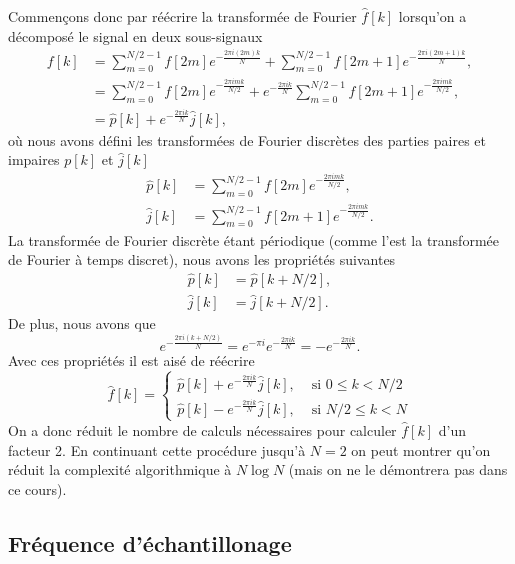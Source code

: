 \documentclass[a4paper,12pt]{book}
\newcommand{\fh}{\hat{f}}
\begin{document}
Commençons donc par réécrire la transformée de Fourier $\fh[k]$ lorsqu'on a décomposé le
signal en deux sous-signaux
\begin{align}
 f[k]&=\sum_{m=0}^{N/2-1} f[2m]e^{-\frac{2\pi i (2m) k}{N}}+\sum_{m=0}^{N/2-1}
 f[2m+1]e^{-\frac{2\pi i (2m+1) k}{N}},\nonumber\\
 &=\sum_{m=0}^{N/2-1} f[2m]e^{-\frac{2\pi i m k}{N/2}}+e^{-\frac{2\pi i k}{N}}\sum_{m=0}^{N/2-1} f[2m+1]e^{-\frac{2\pi i m k}{N/2}},\nonumber\\
 &=\hat{p}[k]+e^{-\frac{2\pi i k}{N}}\hat{j}[k],
\end{align}
où nous avons défini les transformées de Fourier discrètes des parties paires et impaires
$p[k]$ et $\hat{j}[k]$
\begin{align}
 \hat{p}[k]&=\sum_{m=0}^{N/2-1} f[2m]e^{-\frac{2\pi i m k}{N/2}},\\
 \hat{j}[k]&=\sum_{m=0}^{N/2-1} f[2m+1]e^{-\frac{2\pi i m k}{N/2}}.
\end{align}
La transformée de Fourier discrète étant périodique (comme l'est la transformée de Fourier à 
temps discret), nous avons les propriétés suivantes
\begin{align}
 \hat{p}[k]&=\hat{p}[k+N/2],\\
 \hat{j}[k]&=\hat{j}[k+N/2].
\end{align}
De plus, nous avons que 
\begin{equation}
 e^{-\frac{2\pi i (k+N/2)}{N}}=e^{-\pi i}e^{-\frac{2\pi i k}{N}}=-e^{-\frac{2\pi i k}{N}}.
\end{equation}
Avec ces propriétés il est aisé de réécrire 
\begin{equation}
 \fh[k]=\left\{\begin{array}{ll}
                \hat{p}[k]+e^{-\frac{2\pi i k}{N}} \hat{j}[k],&\mbox{ si }0\leq k<N/2\\
                \hat{p}[k]-e^{-\frac{2\pi i k}{N}} \hat{j}[k],&\mbox{ si }N/2\leq k<N
               \end{array}\right.
\end{equation}
On a donc réduit le nombre de calculs nécessaires pour calculer $\fh[k]$ d'un facteur 2.
En continuant cette procédure jusqu'à $N=2$ on peut montrer qu'on réduit la complexité
algorithmique à $N\log N$ (mais on ne le démontrera pas dans ce cours).

\subsection{Fréquence d'échantillonage}
\end{document}
